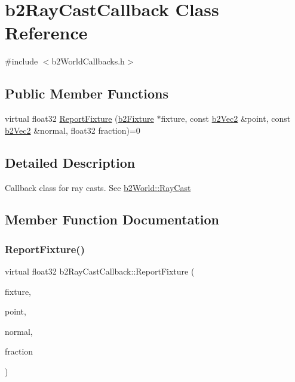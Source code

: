 \hypertarget{classb2_ray_cast_callback}{}\section{b2\+Ray\+Cast\+Callback Class Reference}
\label{classb2_ray_cast_callback}


{\ttfamily \#include $<$b2\+World\+Callbacks.\+h$>$}

\subsection*{Public Member Functions}
\begin{DoxyCompactItemize}
\item 
virtual float32 \hyperlink{classb2_ray_cast_callback_a658d5c8e89e0c73230cc8bddade4f3a4}{Report\+Fixture} (\hyperlink{classb2_fixture}{b2\+Fixture} $\ast$fixture, const \hyperlink{structb2_vec2}{b2\+Vec2} \&point, const \hyperlink{structb2_vec2}{b2\+Vec2} \&normal, float32 fraction)=0
\end{DoxyCompactItemize}


\subsection{Detailed Description}
Callback class for ray casts. See \hyperlink{classb2_world_aa9955d94a254253997daaf16ce77bab6}{b2\+World\+::\+Ray\+Cast} 

\subsection{Member Function Documentation}
\mbox{\label{classb2_ray_cast_callback_a658d5c8e89e0c73230cc8bddade4f3a4}} 
\subsubsection{\texorpdfstring{Report\+Fixture()}{ReportFixture()}}
{\footnotesize\ttfamily virtual float32 b2\+Ray\+Cast\+Callback\+::\+Report\+Fixture (\begin{DoxyParamCaption}\item[{\hyperlink{classb2_fixture}{b2\+Fixture} $\ast$}]{fixture,  }\item[{const \hyperlink{structb2_vec2}{b2\+Vec2} \&}]{point,  }\item[{const \hyperlink{structb2_vec2}{b2\+Vec2} \&}]{normal,  }\item[{float32}]{fraction }\end{DoxyParamCaption})\hspace{0.3cm}{\ttfamily [pure virtual]}}

